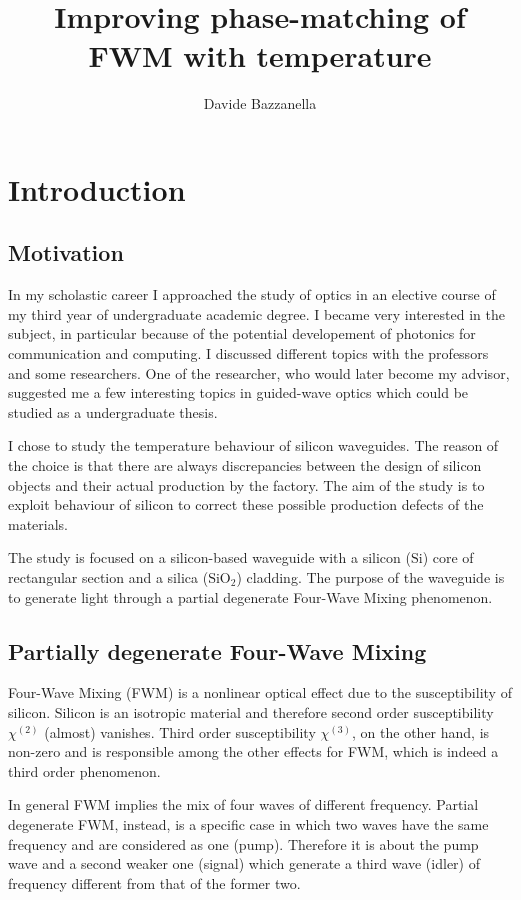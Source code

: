 \documentclass[12pt,a4paper,twoside]{article}
\author{Davide Bazzanella}
\title{Improving phase-matching of FWM with temperature}
\begin{document}

\cleardoublepage 
\setcounter{page}{3}
\tableofcontents

\cleardoublepage
{}

\section{Introduction}
\subsection{Motivation}
In my scholastic career I approached the study of optics in an elective course of my third year of undergraduate academic degree.
I became very interested in the subject, in particular because of the potential developement of photonics for communication and computing.
I discussed different topics with the professors and some researchers.
One of the researcher, who would later become my advisor, suggested me a few interesting topics in guided-wave optics which could be studied as a undergraduate thesis.

I chose to study the temperature behaviour of silicon waveguides.
The reason of the choice is that there are always discrepancies between the design of silicon objects and their actual production by the factory.
The aim of the study is to exploit behaviour of silicon to correct these possible production defects of the materials.

The study is focused on a silicon-based waveguide with a silicon ($\mathrm{Si}$) core of rectangular section and a silica ($\mathrm{SiO}_2$) cladding.
The purpose of the waveguide is to generate light through a partial degenerate Four-Wave Mixing phenomenon.

\subsection{Partially degenerate Four-Wave Mixing}
Four-Wave Mixing (FWM) is a nonlinear optical effect due to the susceptibility of silicon.
Silicon is an isotropic material and therefore second order susceptibility $\chi^{(2)}$ (almost) vanishes.
Third order susceptibility $\chi^{(3)}$, on the other hand, is non-zero and is responsible among the other effects for FWM, which is indeed a third order phenomenon.

In general FWM implies the mix of four waves of different frequency.
Partial degenerate FWM, instead, is a specific case in which two waves have the same frequency and are considered as one (pump).
Therefore it is about the pump wave and a second weaker one (signal) which generate a third wave (idler) of frequency different from that of the former two.
\end{document}
